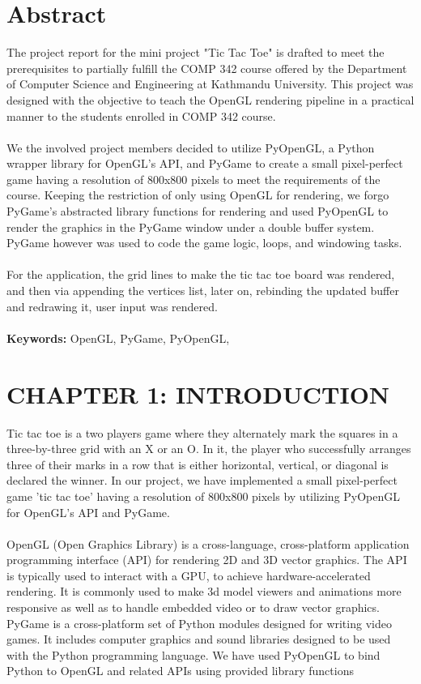 \documentclass[12pt]{article}
\begin{document}
\section*{Abstract}
The project report for the mini project "Tic Tac Toe" is drafted to meet the prerequisites to partially fulfill
the COMP 342 course offered by the Department of Computer Science and Engineering at Kathmandu University.
This project was designed with the objective to teach the OpenGL rendering pipeline in a practical manner to the students enrolled in
COMP 342 course.\\\\
We the involved project members decided to utilize PyOpenGL, a Python wrapper library for OpenGL's API, and PyGame to create a small pixel-perfect game having a resolution of 800x800 pixels
to meet the requirements of the course. Keeping the restriction of only using OpenGL for rendering, we forgo PyGame's abstracted library functions
for rendering and used PyOpenGL to render the graphics in the PyGame window under a double buffer system.
PyGame however was used to code the game logic, loops, and windowing tasks.\\\\
For the application, the grid lines to make the tic tac toe board was rendered, and then via appending the vertices list, later on, rebinding the updated buffer and redrawing it, user input was rendered.
\\\\
\textbf{Keywords: }OpenGL, PyGame, PyOpenGL,

\clearpage
\thispagestyle{empty}
\tableofcontents

\clearpage
\thispagestyle{empty}
\listoffigures

\clearpage
{}
\section{CHAPTER 1: INTRODUCTION}
Tic tac toe is a two players game where they alternately mark the squares in a three-by-three grid with an X or an O.
In it, the player who successfully arranges three of their marks in a row that is either horizontal, vertical, or diagonal
is declared the winner. In our project, we have implemented a small pixel-perfect game 'tic tac toe' having a resolution of
800x800 pixels by utilizing PyOpenGL for OpenGL’s API and PyGame. \\\\
OpenGL (Open Graphics Library) is a cross-language, cross-platform application programming interface (API) for rendering 2D
and 3D vector graphics. The API is typically used to interact with a GPU, to achieve hardware-accelerated rendering. It is
commonly used to make 3d model viewers and animations more responsive as well as to handle embedded video or to draw vector graphics.
PyGame is a cross-platform set of Python modules designed for writing video games. It includes computer graphics and sound libraries
designed to be used with the Python programming language.
We have used PyOpenGL to bind Python to OpenGL and related APIs using provided library functions
\end{document}
